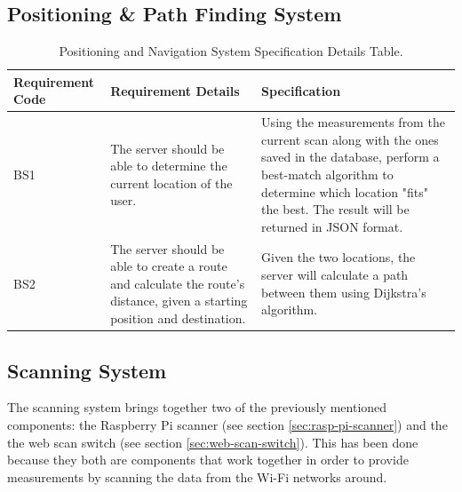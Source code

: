 \subsection{Positioning \& Path Finding System}
\setlength\tabcolsep{4pt}
\begin{longtable}[c]{| p{2cm} | p{5cm} | p{5cm} |}
 \caption{Positioning and Navigation System Specification Details Table.\label{long}}\\
 
\hline
Requirement Code & Requirement Details & Specification \\
\hline 
\endhead

\hline
\endlastfoot

BS1 & The server should be able to determine the current location of the user. & Using the measurements from the current scan along with the ones saved in the database, perform a best-match algorithm to determine which location "fits" the best. The result will be returned in JSON format.\\
\hline
BS2 & The server should be able to create a route and calculate the route's distance, given a starting position and destination. & Given the two locations, the server will calculate a path between them using Dijkstra's algorithm.\\
\hline
\end{longtable}

\subsection{Scanning System}
The scanning system brings together two of the previously mentioned components: the Raspberry Pi scanner (see section \ref{sec:rasp-pi-scanner}) and the the web scan switch (see section \ref{sec:web-scan-switch}). This has been done because they both are components that work together in order to provide measurements by scanning the data from the Wi-Fi networks around.

